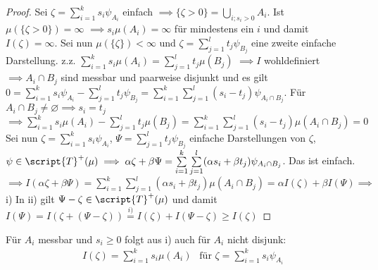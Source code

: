   \begin{proof}
    Sei $\zeta = \sum\limits_{i=1}^{k} s_i \psi_{A_i}$ einfach $\implies \{\zeta > 0\} = \bigcup\limits_{i;s_i >0} A_i$.\newline
    Ist $\mu (\{ \zeta >0\}) = \infty$ $\implies s_i \mu (A_i) = \infty$ für mindestens ein $i$ und damit $I(\zeta )= \infty$. \newline
    Sei nun $\mu(\{\zeta\}) < \infty$ und $\zeta = \sum\limits_{j=1}^l t_j \psi_{B_j}$ eine zweite einfache Darstellung. \newline
    z.z. $\sum\limits_{i=1}^k s_i \mu (A_i) = \sum\limits_{j=1}^l t_j \mu (B_j)$ \newline
    $\implies I$ wohldefiniert $\implies A_i\cap B_j$ sind messbar und paarweise disjunkt und es gilt \newline
    $0 = \sum\limits_{i=1}^k s_i \psi_{A_i} - \sum\limits_{j=1}^l t_j \psi_{B_j} = \sum\limits_{i=1}^k \sum\limits_{j=1}^l (s_i - t_j )\psi_{A_i \cap B_j}$. \newline
    Für $A_i \cap B_j \neq \varnothing \implies s_i = t_j$ \newline $ \implies \sum\limits_{i=1}^{k} s_i \mu (A_i) - \sum\limits_{j=1}^l t_j \mu (B_j) = \sum\limits_{i=1}^k \sum\limits_{j=1}^l (s_i - t_j)\mu (A_i\cap B_j)=0$ \newline
    Sei nun $\zeta = \sum\limits_{i=1}^k s_i \psi_{A_i}$, $\Psi = \sum\limits_{j=1}^l t_j \psi_{B_j}$ einfache Darstellungen von $\zeta$,$\psi\in \script{T}^+(\mu) \\ \implies \alpha \zeta + \beta \Psi = \sum\limits_{i=1}^k \sum\limits_{j=1}^l (\alpha s_i + \beta t_j)\psi_{A_i\cap B_j}$. Das ist einfach. \newline
    $\implies I(\alpha \zeta + \beta \Psi) = \sum\limits_{i=1}^k \sum\limits_{j=1}^l (\alpha s_i + \beta t_j) \mu (A_i \cap B_j) = \alpha I(\zeta) + \beta I(\Psi) \implies$ i) \newline
    In ii) gilt $\Psi - \zeta \in \script{T}^+(\mu)$ und damit $I(\Psi) = I(\zeta + (\Psi - \zeta)) \overset{i)}{=} I(\zeta) + I(\Psi - \zeta) \geq I(\zeta)$
    
  \end{proof}

  \begin{remark}
    Für $A_i$ messbar und $s_i \geq 0$ folgt aus i) auch für $A_i$ nicht disjunk:
    \begin{align*}
      I(\zeta) = \sum\limits_{i=1}^k s_i \mu(A_i) \ \ \text{ für } \zeta = \sum\limits_{i=1}^k s_i \psi_{A_i}
    \end{align*}
  \end{remark}

